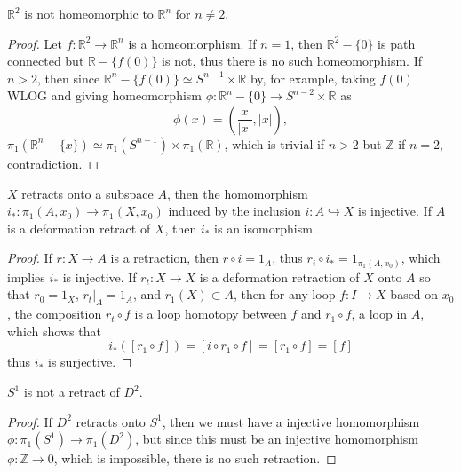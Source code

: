 \begin{cor} $\mathbb{R}^2$ is not homeomorphic to $\mathbb{R}^n$ for $n\neq 2$.
\end{cor}
\begin{proof}
Let $f:\mathbb{R}^2\rightarrow \mathbb{R}^n$ is a homeomorphism. If $n=1$, then $\mathbb{R}^2-\{0\}$ is path connected but $\mathbb{R}-\{f(0)\}$ is not, thus there is no such homeomorphism. If $n>2$, then since $\mathbb{R}^n-\{f(0)\}\simeq S^{n-1}\times \mathbb{R}$ by, for example, taking $f(0)$ WLOG and giving homeomorphism $\phi:\mathbb{R}^n-\{0\}\rightarrow S^{n-2}\times \mathbb{R}$ as
\begin{equation}
\phi(x)=(\frac{x}{|x|},|x|),
\end{equation}
$\pi_1(\mathbb{R}^n-\{x\})\simeq \pi_1(S^{n-1})\times \pi_1(\mathbb{R})$, which is trivial if $n>2$ but $\mathbb{Z}$ if $n=2$, contradiction.
\end{proof}

\begin{prop}  $X$ retracts onto a subspace $A$, then the homomorphism $i_*:\pi_1(A,x_0)\rightarrow \pi_1(X,x_0)$ induced by the inclusion $i:A\hookrightarrow X$ is injective. If $A$ is a deformation retract of $X$, then $i_*$ is an isomorphism.
\end{prop}
\begin{proof}
If $r:X\rightarrow A$ is a retraction, then $r\circ i=1_A$, thus $r_i\circ i_*=1_{\pi_1(A,x_0)}$, which implies $i_*$ is injective. If $r_t:X\rightarrow X$ is a deformation retraction of $X$ onto $A$ so that $r_0=1_X$, $r_t|_A=1_A$, and $r_1(X)\subset A$, then for any loop $f:I\rightarrow X$ based on $x_0$, the composition $r_t\circ f$ is a loop homotopy between $f$ and $r_1\circ f$, a loop in $A$, which shows that
\begin{equation}
i_*([r_1\circ f])=[i\circ r_1\circ f]=[r_1\circ f]=[f]
\end{equation}
thus $i_*$ is surjective.
\end{proof}

\begin{exmp} $S^1$ is not a retract of $D^2$.
\end{exmp}
\begin{proof}
If $D^2$ retracts onto $S^1$, then we must have a injective homomorphism $\phi:\pi_1(S^1)\rightarrow \pi_1(D^2)$, but since this must be an injective homomorphism $\phi:\mathbb{Z}\rightarrow 0$, which is impossible, there is no such retraction.
\end{proof}

